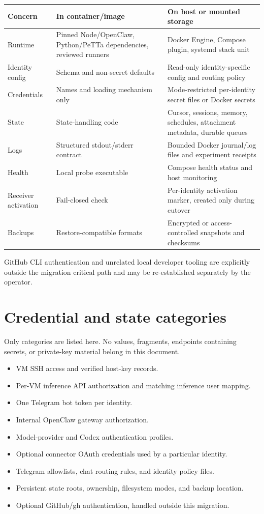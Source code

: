 \documentclass[11pt]{article}
\begin{document}
\begin{longtable}{p{}p{}p{}}
\toprule
Concern & In container/image & On host or mounted storage \\
\midrule
Runtime & Pinned Node/OpenClaw, Python/PeTTa dependencies, reviewed runners &
Docker Engine, Compose plugin, systemd stack unit \\
Identity config & Schema and non-secret defaults & Read-only identity-specific
config and routing policy \\
Credentials & Names and loading mechanism only & Mode-restricted per-identity
secret files or Docker secrets \\
State & State-handling code & Cursor, sessions, memory, schedules, attachment
metadata, durable queues \\
Logs & Structured stdout/stderr contract & Bounded Docker journal/log files and
experiment receipts \\
Health & Local probe executable & Compose health status and host monitoring \\
Receiver activation & Fail-closed check & Per-identity activation marker,
created only during cutover \\
Backups & Restore-compatible formats & Encrypted or access-controlled snapshots
and checksums \\
\bottomrule
\end{longtable}

GitHub CLI authentication and unrelated local developer tooling are explicitly
outside the migration critical path and may be re-established separately by
the operator.

\section{Credential and state categories}

Only categories are listed here. No values, fragments, endpoints containing
secrets, or private-key material belong in this document.

\begin{itemize}
\item VM SSH access and verified host-key records.
\item Per-VM inference API authorization and matching inference user mapping.
\item One Telegram bot token per identity.
\item Internal OpenClaw gateway authorization.
\item Model-provider and Codex authentication profiles.
\item Optional connector OAuth credentials used by a particular identity.
\item Telegram allowlists, chat routing rules, and identity policy files.
\item Persistent state roots, ownership, filesystem modes, and backup location.
\item Optional GitHub/gh authentication, handled outside this migration.
\end{itemize}
\end{document}
